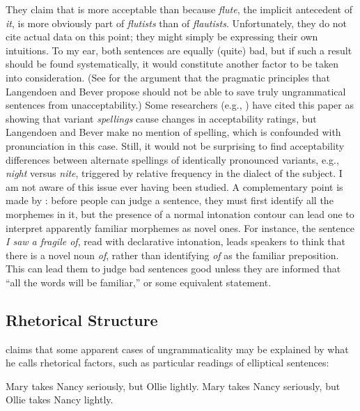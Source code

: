  \noindent
They claim that  is more acceptable than  because \textit{flute}, the implicit antecedent of \textit{it}, is more obviously part of \textit{flutists} than of \textit{flautists}. Unfortunately, they do not cite actual data on this point; they might simply be expressing their own intuitions. To my ear, both sentences are equally (quite) bad, but if such a result should be found systematically, it would constitute another factor to be taken into consideration. (See \citealt{Smith1981} for the argument that the pragmatic principles that Langendoen and Bever propose should not be able to save truly ungrammatical sentences from unacceptability.) Some researchers (e.g., \citealt{Birdsong1989}) have cited this paper as showing that variant \textit{spellings} cause changes in acceptability ratings, but Langendoen and Bever make no mention of spelling, which is confounded with pronunciation in this case. Still, it would not be surprising to find acceptability differences between alternate spellings of identically pronounced variants, e.g., \textit{night} versus \textit{nite}, triggered by relative frequency in the dialect of the subject. I am not aware of this issue ever having been studied. A
complementary point is made by \citet{Hill1961}: before people can judge a sentence, they must first identify all the morphemes in it, but the presence of a normal intonation contour can lead one to interpret apparently familiar morphemes as novel ones. For instance, the sentence \textit{I saw a fragile of}, read with declarative intonation, leads speakers to think that there is a novel noun \textit{of}, rather than identifying \textit{of} as the familiar preposition. This can lead them to judge bad sentences good unless they are informed that ``all the words will be familiar,'' or some equivalent statement.

\subsection{Rhetorical Structure}\label{sec:5.3.7} 

\citet{Langendoen1972} claims that some apparent cases of ungrammaticality may be explained by what he calls rhetorical factors, such as particular readings of elliptical sentences:

\ea\label{ex:5:22}
\ea Mary takes Nancy seriously, but Ollie lightly.
\ex Mary takes Nancy seriously, but Ollie takes Nancy lightly.
\z
\z

